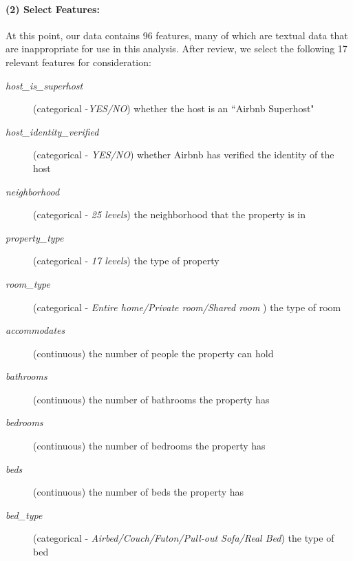 \documentclass[11pt]{article}
\begin{document}
             \paragraph{(2) Select Features:}
             	At this point, our data contains 96 features, many of which are textual data that are inappropriate for use in this analysis. After review, we select the following 17 relevant features for consideration:
                \begin{description}
                	\item[\textit{host\_is\_superhost}] (categorical -\textit{YES/NO}) whether the host is an ``Airbnb Superhost"
                    
                    \item[\textit{host\_identity\_verified}] (categorical - \textit{YES/NO}) whether Airbnb has verified the identity of the host 
                    
                    \item[\textit{neighborhood}] (categorical - \textit{25 levels}) the neighborhood that the property is in
                    
                    \item[\textit{property\_type}] (categorical - \textit{17 levels}) the type of property 
                    
                    \item[\textit{room\_type}] (categorical - \textit{Entire home/Private room/Shared room} ) the type of room 
                    
                    \item[\textit{accommodates}] (continuous) the number of people the property can hold
                    
                    \item[\textit{bathrooms}] (continuous) the number of bathrooms the property has
                    
                    \item[\textit{bedrooms}] (continuous) the number of bedrooms the property has
                    
                    \item[\textit{beds}] (continuous) the number of beds the property has
                    
                    \item[\textit{bed\_type}] (categorical - \textit{Airbed/Couch/Futon/Pull-out Sofa/Real Bed}) the type of bed 
                    

\end{description}
\end{document}
